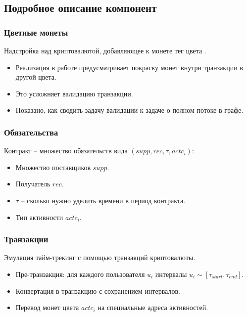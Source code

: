 \documentclass[11pt,handout,pdf,hyperref={unicode}]{beamer}
\begin{document}
\subsection{Подробное описание компонент}

\begin{frame}
  \frametitle{Цветные монеты}

  Надстройка над криптовалютой, добавляющее к монете тег цвета
  \parencite{epobc} \parencite{oap}.

  \begin{itemize}
  \item Реализация в работе предусматривает покраску монет внутри
    транзакции в другой цвета.
  \item Это усложняет валидацию транзакции.
  \item Показано, как сводить задачу валидации к задаче о полном
    потоке в графе.
  \end{itemize}
\end{frame}

\begin{frame}
  \frametitle{Обязательства}

  Контракт -- множество обязательств вида $(supp, rec, \tau,
  actc_i)$:
  \begin{itemize}
  \item Множество поставщиков $supp$.
  \item Получатель $rec$.
  \item $\tau$ -- сколько нужно уделить времени в период контракта.
  \item Тип активности $actc_i$.
  \end{itemize}
\end{frame}

\begin{frame}
  \frametitle{Транзакции}

  Эмуляция тайм-трекинг с помощью транзакций криптовалюты.
  \begin{itemize}
  \item Пре-транзакция: для каждого пользователя $u_i$ интервалы $u_i
    \sim [\tau_{start}, \tau_{end}]$.
  \item Конвертация в транзакцию с сохранением интервалов.
  \item Перевод монет цвета $actc_i$ на специальные адреса
    активностей.
  \end{itemize}
\end{frame}
\end{document}
